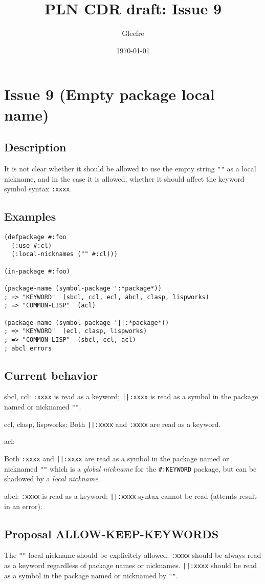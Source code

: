 \documentclass[11pt]{article}
\author{Gleefre}
\date{\today}
\title{PLN CDR draft: Issue 9}
\begin{document}
\maketitle

\section{Issue 9 (Empty package local name)}
\label{sec:org811b5f6}
\subsection{Description}
\label{sec:orgdfdcf70}
It is not clear whether it should be allowed to use the empty string \texttt{""} as a
local nickname, and in the case it is allowed, whether it should affect the
keyword symbol syntax \texttt{:xxxx}.
\subsection{Examples}
\label{sec:org367dfe7}
\begin{verbatim}
(defpackage #:foo
  (:use #:cl)
  (:local-nicknames ("" #:cl)))

(in-package #:foo)

(package-name (symbol-package ':*package*))
; => "KEYWORD"  (sbcl, ccl, ecl, abcl, clasp, lispworks)
; => "COMMON-LISP"  (acl)

(package-name (symbol-package '||:*package*))
; => "KEYWORD"  (ecl, clasp, lispworks)
; => "COMMON-LISP"  (sbcl, ccl, acl)
; abcl errors
\end{verbatim}
\subsection{Current behavior}
\label{sec:org26b31c4}
sbcl, ccl:
\texttt{:xxxx} is read as a keyword;
\texttt{||:xxxx} is read as a symbol in the package named or nicknamed \texttt{""}.

ecl, clasp, lispworks:
Both \texttt{||:xxxx} and \texttt{:xxxx} are read as a keyword.

acl:

Both \texttt{:xxxx} and \texttt{||:xxxx} are read as a symbol in the package named or nicknamed
\texttt{""} which is a \emph{global nickname} for the \texttt{\#:KEYWORD} package, but can be shadowed
by a \emph{local nickname}.

abcl:
\texttt{:xxxx} is read as a keyword;
\texttt{||:xxxx} syntax cannot be read (attemts result in an error).
\subsection{Proposal ALLOW-KEEP-KEYWORDS}
\label{sec:orgf364c2a}
The \texttt{""} local nickname should be explicitely allowed. \texttt{:xxxx} should be always
read as a keyword regardless of package names or nicknames. \texttt{||:xxxx} should be
read as a symbol in the package named or nicknamed by \texttt{""}.
\end{document}
